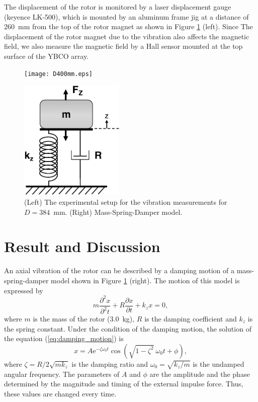\documentclass[a4paper]{jpconf}
\begin{document}
The displacement of the rotor is monitored by a laser displacement gauge (keyence LK-500),
which is mounted by an aluminum frame jig at a distance of 260~mm from the top of the rotor magnet as shown in Figure \ref{fig:d400} (left).
Since The displacement of the rotor magnet due to the vibration also affects the magnetic field,
we also measure the magnetic field by a Hall sensor mounted at the top surface of the YBCO array.

\begin{figure}[htbp]
  \centering
  \begin{minipage}{0.6\hsize}
    \texttt{[image: D400mm.eps]}
  \end{minipage}
  \begin{minipage}{0.3\hsize}
    \centering
    \includegraphics[width=50mm]{SpringSystem.eps}
  \end{minipage}
  \caption{(Left) The experimental setup for the vibration measurements for $D=384$~mm. (Right) Mass-Spring-Damper model.}
  \label{fig:d400}
\end{figure}


\section*{Result and Discussion}

An axial vibration of the rotor can be described by a damping motion of a mass-spring-damper model shown in Figure \ref{fig:d400} (right).
The motion of this model is expressed by
\begin{equation}
  m \frac{\partial^{2} x}{\partial^{2} t} + R \frac{\partial x}{\partial t} + k_{z} x = 0,
  \label{eq:damping_motion}
\end{equation}
where $m$ is the mass of the rotor (3.0~kg), $R$ is the damping coefficient and $k_{z}$ is the spring constant.
Under the condition of the damping motion, the solution of the equation (\ref{eq:damping_motion}) is
\begin{equation}
  x = A \mathrm{e}^{- \zeta \omega_{0} t} \cos( \sqrt{1 - \zeta^{2}} \ \omega_{0} t + \phi),
  \label{eq:damping}
\end{equation}
where $\zeta = R / 2 \sqrt{mk_{z}}$ is the damping ratio and $\omega_{0} = \sqrt{k_{z}/m}$ is the undamped angular frequency.
The parameters of $A$ and $\phi$ are the amplitude and the phase determined by the magnitude and timing of the external impulse force.
Thus, these values are changed every time.
\end{document}
